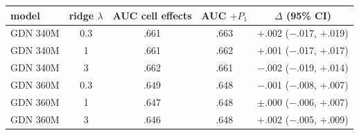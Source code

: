 \begin{tabular}{lcccc}
\toprule
model & ridge $\lambda$ & AUC cell effects & AUC $+P_1$ & $\Delta$ (95\% CI) \\
\midrule
GDN 340M & 0.3 & .661 & .663 & $+$.002 ($-$.017, $+$.019) \\
GDN 340M & 1 & .661 & .662 & $+$.001 ($-$.017, $+$.017) \\
GDN 340M & 3 & .662 & .661 & $-$.002 ($-$.019, $+$.014) \\
GDN 360M & 0.3 & .649 & .648 & $-$.001 ($-$.008, $+$.007) \\
GDN 360M & 1 & .647 & .648 & $\pm$.000 ($-$.006, $+$.007) \\
GDN 360M & 3 & .646 & .648 & $+$.002 ($-$.005, $+$.009) \\
\bottomrule
\end{tabular}
